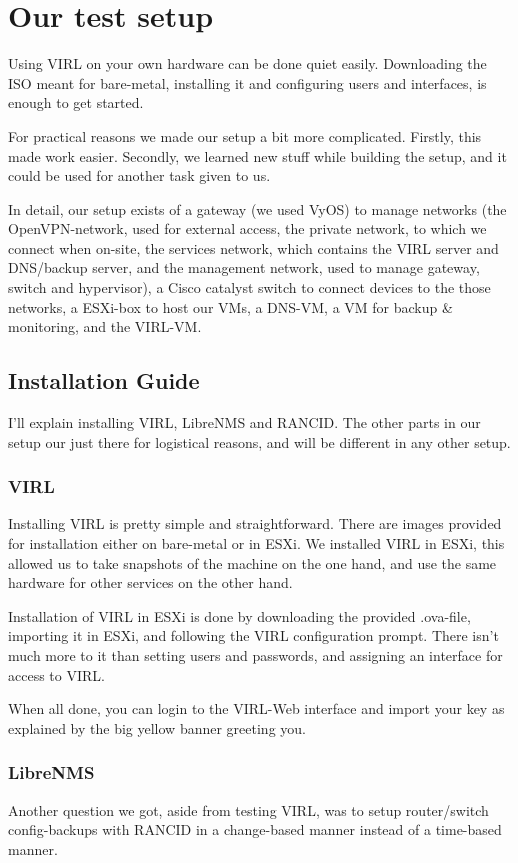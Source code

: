 \documentclass{article}
\begin{document}
\newpage
\section{Our test setup}
Using VIRL on your own hardware can be done quiet easily.
Downloading the ISO meant for bare-metal, installing it and
configuring users and interfaces, is enough to get started.

For practical reasons we made our setup a bit more complicated.
Firstly, this made work easier.
Secondly, we learned new stuff while building the setup,
and it could be used for another task given to us.

In detail, our setup exists of a gateway (we used VyOS) to manage networks
(the OpenVPN-network, used for external access, the private network, to which we connect when on-site,
the services network, which contains the VIRL server and DNS/backup server,
and the management network, used to manage gateway, switch and hypervisor),
a Cisco catalyst switch to connect devices to the those networks,
a ESXi-box to host our VMs, a DNS-VM, a VM for backup \& monitoring, 
and the VIRL-VM.

\subsection{Installation Guide}
I'll explain installing VIRL, LibreNMS and RANCID.
The other parts in our setup our just there for logistical reasons,
and will be different in any other setup.

\subsubsection{VIRL}
Installing VIRL is pretty simple and straightforward.
There are images provided for installation either on bare-metal or in ESXi.
We installed VIRL in ESXi, this allowed us to take snapshots of the machine on the one hand,
and use the same hardware for other services on the other hand.

Installation of VIRL in ESXi is done by downloading the provided .ova-file,
importing it in ESXi, and following the VIRL configuration prompt.
There isn't much more to it than setting users and passwords,
and assigning an interface for access to VIRL.

When all done, you can login to the VIRL-Web interface
and import your key as explained by the big yellow banner greeting you.

\subsubsection{LibreNMS}
Another question we got, aside from testing VIRL,
was to setup router/switch config-backups with RANCID in a change-based manner
instead of a time-based manner.
\end{document}
